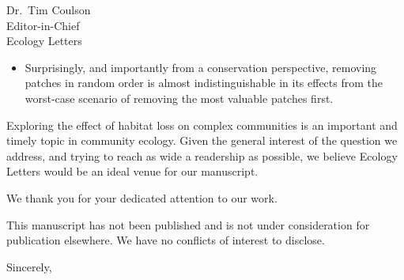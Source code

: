 \documentclass[11pt]{letter}
\begin{document}
\begin{letter}{
    \vspace{-2cm}
    
    Dr.~Tim Coulson\\
    Editor-in-Chief\\
    Ecology Letters}
\begin{itemize}
\item Surprisingly, and importantly from a conservation perspective, removing patches in random order is almost indistinguishable in its effects from the worst-case scenario of removing the most valuable patches first.

\end{itemize}

Exploring the effect of habitat loss on complex communities is an important and timely topic in community ecology. Given the general interest of the question we address, and trying to reach as wide a readership as possible, we believe Ecology Letters would be an ideal venue for our manuscript.

We thank you for your dedicated attention to our work.

This manuscript has not been published and is not under consideration for publication elsewhere. We have no conflicts of interest to disclose.

\closing{Sincerely,}

\end{letter}
\end{document}
